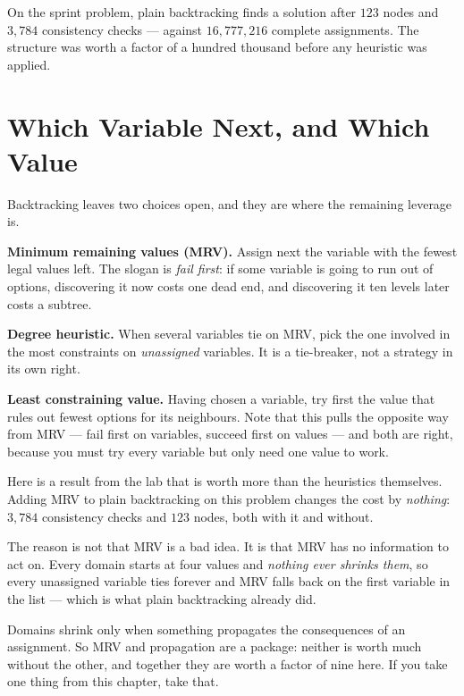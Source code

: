 On the sprint problem, plain backtracking finds a solution after $123$ nodes and
$3{,}784$ consistency checks --- against $16{,}777{,}216$ complete assignments. The
structure was worth a factor of a hundred thousand before any heuristic was
applied.

\section{Which Variable Next, and Which Value}

Backtracking leaves two choices open, and they are where the remaining leverage is.

\textbf{Minimum remaining values (MRV).} Assign next the variable with the fewest
legal values left. The slogan is \emph{fail first}: if some variable is going to
run out of options, discovering it now costs one dead end, and discovering it ten
levels later costs a subtree.

\textbf{Degree heuristic.} When several variables tie on MRV, pick the one involved
in the most constraints on \emph{unassigned} variables. It is a tie-breaker, not a
strategy in its own right.

\textbf{Least constraining value.} Having chosen a variable, try first the value
that rules out fewest options for its neighbours. Note that this pulls the opposite
way from MRV --- fail first on variables, succeed first on values --- and both are
right, because you must try every variable but only need one value to work.

\begin{alertbox}
Here is a result from the lab that is worth more than the heuristics themselves.
Adding MRV to plain backtracking on this problem changes the cost by
\emph{nothing}: $3{,}784$ consistency checks and $123$ nodes, both with it and
without.

The reason is not that MRV is a bad idea. It is that MRV has no information to act
on. Every domain starts at four values and \emph{nothing ever shrinks them}, so
every unassigned variable ties forever and MRV falls back on the first variable in
the list --- which is what plain backtracking already did.

Domains shrink only when something propagates the consequences of an assignment.
So MRV and propagation are a package: neither is worth much without the other, and
together they are worth a factor of nine here. If you take one thing from this
chapter, take that.
\end{alertbox}

